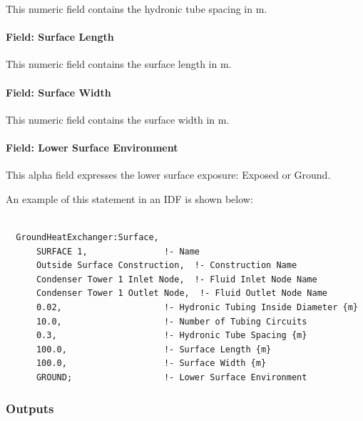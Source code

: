 This numeric field contains the hydronic tube spacing in m.

\paragraph{Field: Surface Length}\label{field-surface-length}

This numeric field contains the surface length in m.

\paragraph{Field: Surface Width}\label{field-surface-width}

This numeric field contains the surface width in m.

\paragraph{Field: Lower Surface Environment}\label{field-lower-surface-environment}

This alpha field expresses the lower surface exposure: Exposed or Ground.

An example of this statement in an IDF is shown below:

\begin{lstlisting}

  GroundHeatExchanger:Surface,
      SURFACE 1,               !- Name
      Outside Surface Construction,  !- Construction Name
      Condenser Tower 1 Inlet Node,  !- Fluid Inlet Node Name
      Condenser Tower 1 Outlet Node,  !- Fluid Outlet Node Name
      0.02,                    !- Hydronic Tubing Inside Diameter {m}
      10.0,                    !- Number of Tubing Circuits
      0.3,                     !- Hydronic Tube Spacing {m}
      100.0,                   !- Surface Length {m}
      100.0,                   !- Surface Width {m}
      GROUND;                  !- Lower Surface Environment
\end{lstlisting}

\subsubsection{Outputs}\label{outputs-13-000}

